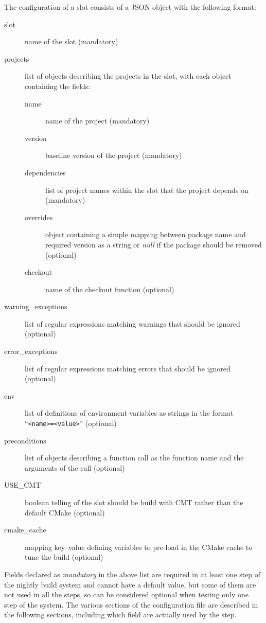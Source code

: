 \documentclass{lhcbnote}
\begin{document}
The configuration of a slot consists of a JSON object with the following format:
\begin{description}
  \item[slot] name of the slot (mandatory)
  \item[projects] list of objects describing the projects in the slot, with each
  object containing the fields:
  \begin{description}
    \item[name] name of the project (mandatory)
    \item[version] baseline version of the project (mandatory)
    \item[dependencies] list of project names within the slot that the project
depends on (mandatory)
    \item[overrides] object containing a simple mapping between package name and
required version as a string or \emph{null} if the package should be removed
(optional)
    \item[checkout] name of the checkout function (optional)
  \end{description}
  \item[warning\_exceptions] list of regular expressions matching warnings that
  should be ignored (optional)
  \item[error\_exceptions] list of regular expressions matching errors that
  should be ignored (optional)
  \item[env] list of definitions of environment variables as strings in the
  format ``\texttt{<name>=<value>}'' (optional)
  \item[preconditions] list of objects describing a function call as the
  function name and the arguments of the call (optional)
  \item[USE\_CMT] boolean telling of the slot should be build with CMT rather
  than the default CMake (optional)
  \item[cmake\_cache] mapping key--value defining variables to pre-load in the
  CMake cache to tune the build (optional)
\end{description}
Fields declared as \emph{mandatory} in the above list are required in at least
one step of the nightly build system and cannot have a default value, but some
of them are not used in all the steps, so can be considered optional when
testing only one step of the system.  The various sections of the configuration
file are described in the following sections, including which field are actually
used by the step.
\end{document}
